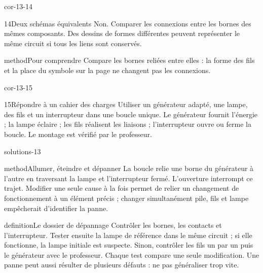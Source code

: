 \documentclass[12pt,twoside,openany]{book}
\begin{document}
\begin{blocLivre}{cor-13-14}
\begin{corrige}{14}{Deux schémas équivalents}
Non. Comparer les connexions entre les bornes des mêmes composants. Des dessins de formes différentes peuvent représenter le même circuit si tous les liens sont conservés.\par
\begin{pcEncadre}{method}{Pour comprendre}
Compare les bornes reliées entre elles : la forme des fils et la place du symbole sur la page ne changent pas les connexions.\par
\end{pcEncadre}
\end{corrige}\end{blocLivre}
\begin{blocLivre}{cor-13-15}
\begin{corrige}{15}{Répondre à un cahier des charges}
Utiliser un générateur adapté, une lampe, des fils et un interrupteur dans une boucle unique. Le générateur fournit l’énergie ; la lampe éclaire ; les fils réalisent les liaisons ; l’interrupteur ouvre ou ferme la boucle. Le montage est vérifié par le professeur.\par
{}
\end{corrige}\end{blocLivre}
\label{solutions-13}
\begin{pcFiche}{solutions-13}
\begin{pcEncadre}{method}{Allumer, éteindre et dépanner}
La boucle relie une borne du générateur à l’autre en traversant la lampe et l’interrupteur fermé. L’ouverture interrompt ce trajet. Modifier une seule cause à la fois permet de relier un changement de fonctionnement à un élément précis ; changer simultanément pile, fils et lampe empêcherait d’identifier la panne.\par
\end{pcEncadre}
\label{defi-cor-13}
\begin{pcEncadre}{definition}{Le dossier de dépannage}
Contrôler les bornes, les contacts et l’interrupteur. Tester ensuite la lampe de référence dans le même circuit ; si elle fonctionne, la lampe initiale est suspecte. Sinon, contrôler les fils un par un puis le générateur avec le professeur. Chaque test compare une seule modification. Une panne peut aussi résulter de plusieurs défauts : ne pas généraliser trop vite.\par
\end{pcEncadre}
\end{pcFiche}
\end{document}
